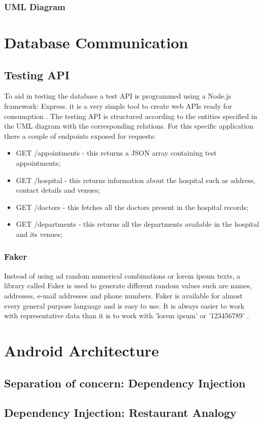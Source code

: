 \subsubsection{UML Diagram}
\section{Database Communication}
\subsection{Testing API}
To aid in testing the database a test API is programmed using a Node.js framework: Express. it is a very simple tool to create web APIs ready for consumption \cite{Express2019}. The testing API is structured according to the entities specified in the UML diagram with the corresponding relations. For this specific application there a couple of endpoints exposed for requests:
\begin{itemize}
\item GET /appointments - this returns a JSON array containing test appointments;
\item GET /hospital - this returns information about the hospital such as address, contact details and venues;
\item GET /doctors - this fetches all the doctors present in the hospital records;
\item GET /departments - this returns all the departments available in the hospital and its venues;
\end{itemize}
\subsubsection{Faker}
Instead of using ad random numerical combinations or lorem ipsum texts, a library called Faker is used to generate different random values such are names, addresses, e-mail addresses and phone numbers. Faker is available for almost every general purpose language and is easy to use. It is always easier to work with representative data than it is to work with 'lorem ipsum' or '123456789' \cite{DanieleFaraglia2014}.
\section{Android Architecture}
\subsection{Separation of concern: Dependency Injection}
\subsection{Dependency Injection: Restaurant Analogy}
